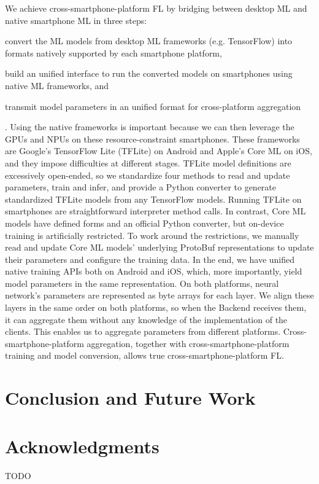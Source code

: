 \documentclass[letterpaper]{article} %
\begin{document}
We achieve cross-smartphone-platform FL by bridging between
desktop ML and native smartphone ML in three steps:
\begin{enumerate*}[label=\arabic*.]
    \item convert the ML models from desktop ML frameworks (e.g. TensorFlow)
        into formats natively supported by each smartphone platform,
    \item build an unified interface to run the converted models on smartphones
        using native ML frameworks, and
    \item transmit model parameters in an unified format for
        cross-platform aggregation
\end{enumerate*}.
Using the native frameworks is important because
we can then leverage the GPUs and NPUs on these resource-constraint smartphones.
These frameworks are Google's TensorFlow Lite (TFLite) on Android and
Apple's Core ML on iOS,
and they impose difficulties at different stages.
TFLite model definitions are excessively open-ended,
so we standardize four methods to read and update parameters,
train and infer, and
provide a Python converter to generate standardized TFLite models from
any TensorFlow models.
Running TFLite on smartphones are straightforward interpreter method calls.
In contrast, Core ML models have defined forms and an official Python converter,
but on-device training is artificially restricted.
To work around the restrictions,
we manually read and update Core ML models' underlying ProtoBuf representations
to update their parameters and configure the training data.
In the end, we have unified native training APIs both on Android and iOS,
which, more importantly, yield model parameters in the same representation.
On both platforms, neural network's parameters are represented as byte arrays
for each layer.
We align these layers in the same order on both platforms,
so when the Backend receives them,
it can aggregate them without any knowledge of
the implementation of the clients.
This enables us to aggregate parameters from different platforms.
Cross-smartphone-platform aggregation,
together with cross-smartphone-platform training and model conversion,
allows true cross-smartphone-platform FL.

\section{Conclusion and Future Work}


\appendix

\section*{Acknowledgments}
TODO

\bigskip


\end{document}
